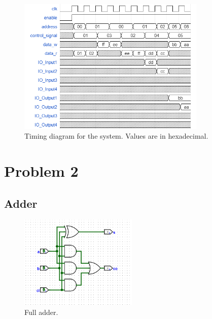 \documentclass{article}
\begin{document}
\begin{figure}[H]
    \centering
    \includegraphics[width=0.8\textwidth]{./images/timing_diagram.png}
    \caption{Timing diagram for the system. Values are in hexadecimal.}
\end{figure}

\section*{Problem 2}
\subsection*{Adder}

\begin{figure}[H]
    \centering
    \includegraphics[width=0.5\textwidth]{./images/full_adder.png}
    \caption{Full adder.}
\end{figure}
\end{document}
